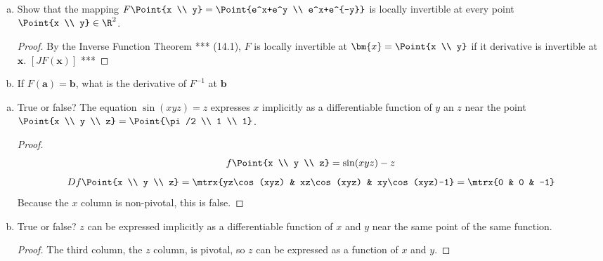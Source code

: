  \begin{enumerate}[a.]
  \item Show that the mapping $F\Point{x \\ y}=\Point{e^x+e^y \\ e^x+e^{-y}}$ is locally invertible at every point $\Point{x \\ y}\in \R^2$.

  \begin{proof}
    By the Inverse Function Theorem *** (14.1), $F$ is locally invertible at $\bm{x} = \Point{x \\ y}$ if it derivative is invertible at $\bm{x}$. $[JF(\bm{x})]$ ***
  \end{proof}

  \item If $F(\bm{a})=\bm{b}$, what is the derivative of $F^{-1}$ at $\bm{b}$
\end{enumerate}

 \begin{enumerate}[a.]
\item True or false? The equation $\sin (xyz)=z$ expresses $x$ implicitly as a differentiable function of $y$ an $z$ near the point $\Point{x \\ y \\ z} = \Point{\pi/2 \\ 1 \\ 1}$.

\begin{proof}
  \[f\Point{x \\ y \\ z} = \sin (xyz) - z\]
  \[Df\Point{x \\ y \\ z} = \mtrx{yz\cos(xyz) & xz\cos(xyz) & xy\cos(xyz)-1} = \mtrx{0 & 0 & -1}\]
  Because the $x$ column is non-pivotal, this is false.
\end{proof}

\item True or false? $z$ can be expressed implicitly as a differentiable function of $x$ and $y$ near the same point of the same function.

\begin{proof}
  The third column, the $z$ column, is pivotal, so $z$ can be expressed as a function of $x$ and $y$. 
\end{proof}

\end{enumerate}
